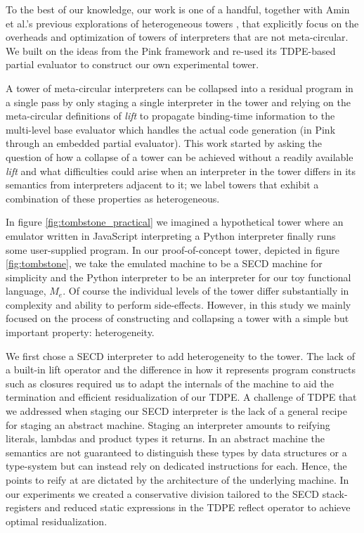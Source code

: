 \documentclass[a4paper,12pt,twoside,openright]{report}
\theoremstyle{definition}
\newcommand{\mevl}{$M_{e}$}
\begin{document}
To the best of our knowledge, our work is one of a handful, together with Amin et al.'s previous explorations of heterogeneous towers \cite{amin2017collapsing}, that explicitly focus on the overheads and optimization of towers of interpreters that are not meta-circular. We built on the ideas from the Pink framework and re-used its TDPE-based partial evaluator to construct our own experimental tower.

A tower of meta-circular interpreters can be collapsed into a residual program in a single pass by only staging a single interpreter in the tower and relying on the meta-circular definitions of \textit{lift} to propagate binding-time information to the multi-level base evaluator which handles the actual code generation (in Pink through an embedded partial evaluator). This work started by asking the question of how a collapse of a tower can be achieved without a readily available \textit{lift} and what difficulties could arise when an interpreter in the tower differs in its semantics from interpreters adjacent to it; we label towers that exhibit a combination of these properties as heterogeneous.

In figure \ref{fig:tombstone_practical} we imagined a hypothetical tower where an emulator written in JavaScript interpreting a Python interpreter finally runs some user-supplied program. In our proof-of-concept tower, depicted in figure \ref{fig:tombstone}, we take the emulated machine to be a SECD machine for simplicity and the Python interpreter to be an interpreter for our toy functional language, \mevl. Of course the individual levels of the tower differ substantially in complexity and ability to perform side-effects. However, in this study we mainly focused on the process of constructing and collapsing a tower with a simple but important property: heterogeneity.

We first chose a SECD interpreter to add heterogeneity to the tower. The lack of a built-in lift operator and the difference in how it represents program constructs such as closures required us to adapt the internals of the machine to aid the termination and efficient residualization of our TDPE. A challenge of TDPE that we addressed when staging our SECD interpreter is the lack of a general recipe for staging an abstract machine. Staging an interpreter amounts to reifying literals, lambdas and product types it returns. In an abstract machine the semantics are not guaranteed to distinguish these types by data structures or a type-system but can instead rely on dedicated instructions for each. Hence, the points to reify at are dictated by the architecture of the underlying machine. In our experiments we created a conservative division tailored to the SECD stack-registers and reduced static expressions in the TDPE reflect operator to achieve optimal residualization.
\end{document}
